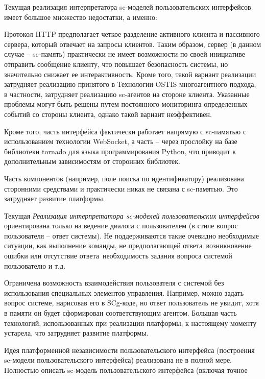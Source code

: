 \begin{scnitemize}
\begin{scnitemize}
Текущая реализация интерпретатора sc-моделей пользовательских интерфейсов имеет большое множество недостатки, а именно:
\begin{scnitemize}
    \item Протокол HTTP предполагает четкое разделение активного клиента и пассивного сервера, который отвечает
    на запросы клиентов. Таким образом, сервер (в данном случае -- sc-память) практически не имеет возможности по
    своей инициативе отправить сообщение клиенту, что повышает безопасность системы, но значительно снижает ее
    интерактивность. Кроме того, такой вариант реализации затрудняет реализацию принятого в Технологии OSTIS
    многоагентного подхода, в частности, затрудняет реализацию sc-агентов на стороне клиента. Указанные проблемы
    могут быть решены путем постоянного мониторинга определенных событий со стороны клиента, однако такой вариант
    неэффективен.
    \item Кроме того, часть интерфейса фактически работает напрямую с sc-памятью с использованием технологии
    WebSocket, а часть -- через прослойку на базе библиотеки tornado для языка программирования Python,
    что приводит к дополнительным зависимостям от сторонних библиотек.
    \item Часть компонентов (например, поле поиска по идентификатору) реализована сторонними средствами и практически
    никак не связана с sc-памятью. Это затрудняет развитие платформы.
    \item Текущая \textit{Реализация интерпретатора sc-моделей пользовательских интерфейсов} ориентирована только на
    ведение диалога с пользователем (в стиле вопрос пользователя -- ответ системы). Не поддерживаются такие очевидно
    необходимые ситуации, как выполнение команды, не предполагающей ответа~возникновение ошибки или отсутствие
    ответа~необходимость задания вопроса системой пользователю и т.д.
    \item Ограничена возможность взаимодействия пользователя с системой без использования специальных элементов
    управления. Например, можно задать вопрос системе, нарисовав его в SCg-коде, но ответ пользователь не увидит, хотя
    в памяти он будет сформирован соответствующим агентом. Большая часть технологий, использованных при реализации
    платформы, к настоящему моменту устарела, что затрудняет развитие платформы.
    \item Идея платформенной независимости пользовательского интерфейса (построения sc-модели пользовательского
    интерфейса) реализована не в полной мере. Полностью описать sc-модель пользовательского интерфейса (включая точное

\end{scnitemize}
\end{scnitemize}
\end{scnitemize}
